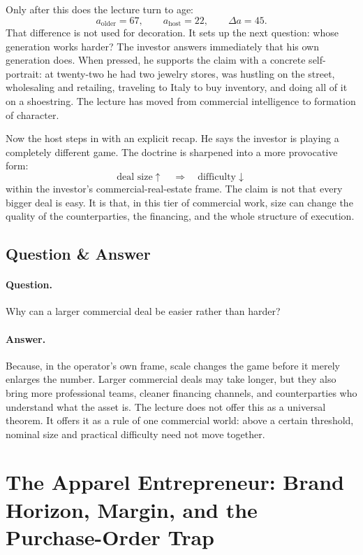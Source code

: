 Only after this does the lecture turn to age:
\begin{equation}
a_{\text{older}} = 67,\qquad
a_{\text{host}} = 22,\qquad
\Delta a = 45.
\end{equation}
That difference is not used for decoration. It sets up the next question: whose generation works harder? The investor answers immediately that his own generation does. When pressed, he supports the claim with a concrete self-portrait: at twenty-two he had two jewelry stores, was hustling on the street, wholesaling and retailing, traveling to Italy to buy inventory, and doing all of it on a shoestring. The lecture has moved from commercial intelligence to formation of character.

Now the host steps in with an explicit recap. He says the investor is playing a completely different game. The doctrine is sharpened into a more provocative form:
\begin{equation}
\text{deal size} \uparrow \quad \Rightarrow \quad \text{difficulty} \downarrow
\end{equation}
within the investor's commercial-real-estate frame. The claim is not that every bigger deal is easy. It is that, in this tier of commercial work, size can change the quality of the counterparties, the financing, and the whole structure of execution.

\subsection{Question \& Answer}

\paragraph{Question.} Why can a larger commercial deal be easier rather than harder?

\paragraph{Answer.} Because, in the operator's own frame, scale changes the game before it merely enlarges the number. Larger commercial deals may take longer, but they also bring more professional teams, cleaner financing channels, and counterparties who understand what the asset is. The lecture does not offer this as a universal theorem. It offers it as a rule of one commercial world: above a certain threshold, nominal size and practical difficulty need not move together.

\section{The Apparel Entrepreneur: Brand Horizon, Margin, and the Purchase-Order Trap}

